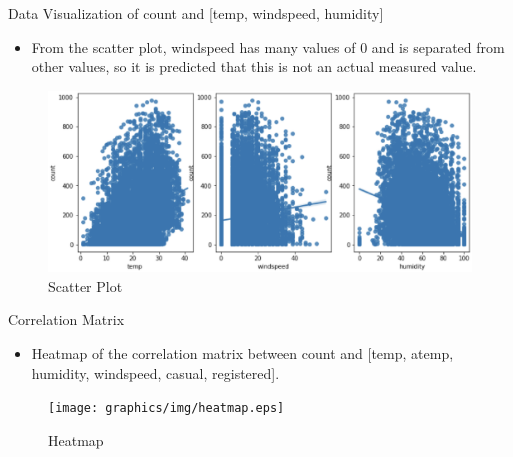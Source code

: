 \documentclass[
 size=14pt,
 paper=smartboard,  %
 mode=present, 		%
 display=slides, 	%
 style=tuliplab,  	%
 pauseslide,
 fleqn,leqno]{powerdot}
\begin{document}
      \begin{slide}[toc=,bm=]{ Data Visualization of count and [temp, windspeed, humidity]}

        \begin{itemize}
        \item From the scatter plot,  windspeed has many values of 0 and is separated from other values, so it is predicted that this is not an actual measured value.
        \end{itemize}
        \begin{figure}
          \centering
          \centerline{\includegraphics[scale=0.4,width=1.0\textwidth,height=0.4\textwidth]{graphics/img/scatterplot.eps}}
          \caption{Scatter Plot}\label{fig:Scatter Plot}
        \end{figure}
        \end{slide}
    

  \begin{slide}[toc=,bm=]{ Correlation Matrix }
    \begin{itemize}
      \item  Heatmap of the correlation matrix between count and [temp, atemp, humidity, windspeed, casual, registered].
    \end{itemize}
    \begin{figure}
      \centering
      \centerline{\texttt{[image: graphics/img/heatmap.eps]}}
      \caption{Heatmap}\label{fig:Heatmap}
    \end{figure}
    \end{slide}
\end{document}

